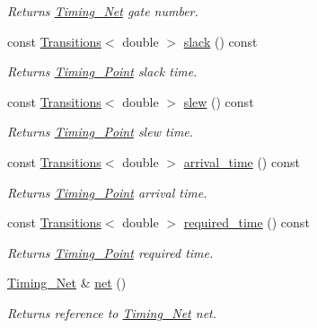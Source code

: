 \begin{DoxyCompactItemize}
\begin{DoxyCompactList}\small\item\em Returns \hyperlink{classTiming__Analysis_1_1Timing__Net}{Timing\-\_\-\-Net} gate number. \end{DoxyCompactList}\item 
const \hyperlink{classTransitions}{Transitions}$<$ double $>$ \hyperlink{classTiming__Analysis_1_1Timing__Point_af5a20a073bd09092700ceed49a74e3e7}{slack} () const 
\begin{DoxyCompactList}\small\item\em Returns \hyperlink{classTiming__Analysis_1_1Timing__Point}{Timing\-\_\-\-Point} slack time. \end{DoxyCompactList}\item 
const \hyperlink{classTransitions}{Transitions}$<$ double $>$ \hyperlink{classTiming__Analysis_1_1Timing__Point_ae4d46c6ca5f00b75088e2edb5a3bac21}{slew} () const 
\begin{DoxyCompactList}\small\item\em Returns \hyperlink{classTiming__Analysis_1_1Timing__Point}{Timing\-\_\-\-Point} slew time. \end{DoxyCompactList}\item 
const \hyperlink{classTransitions}{Transitions}$<$ double $>$ \hyperlink{classTiming__Analysis_1_1Timing__Point_ad5a21b6fae7de267768c6f108a96cc4b}{arrival\-\_\-time} () const 
\begin{DoxyCompactList}\small\item\em Returns \hyperlink{classTiming__Analysis_1_1Timing__Point}{Timing\-\_\-\-Point} arrival time. \end{DoxyCompactList}\item 
const \hyperlink{classTransitions}{Transitions}$<$ double $>$ \hyperlink{classTiming__Analysis_1_1Timing__Point_aab60710f64cbc89f7316515aaca8ea17}{required\-\_\-time} () const 
\begin{DoxyCompactList}\small\item\em Returns \hyperlink{classTiming__Analysis_1_1Timing__Point}{Timing\-\_\-\-Point} required time. \end{DoxyCompactList}\item 
\hyperlink{classTiming__Analysis_1_1Timing__Net}{Timing\-\_\-\-Net} \& \hyperlink{classTiming__Analysis_1_1Timing__Point_ae5be69561ff151feb055e8081911d4c1}{net} ()
\begin{DoxyCompactList}\small\item\em Returns reference to \hyperlink{classTiming__Analysis_1_1Timing__Net}{Timing\-\_\-\-Net} net. \end{DoxyCompactList}\item 

\end{DoxyCompactItemize}
